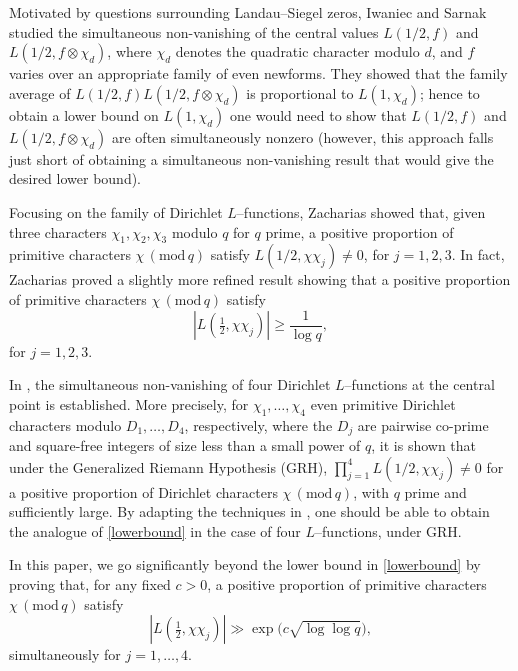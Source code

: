 \documentclass[12pt, reqno]{amsart}
\renewcommand{\pmod}[1]{\,(\mathrm{mod}\,#1)}
\numberwithin{equation}{section}
\numberwithin{theorem}{section}
\numberwithin{equation}{section}
\begin{document}
Motivated by questions surrounding Landau–Siegel zeros, Iwaniec and Sarnak \cite{IS2} studied the simultaneous non-vanishing of the central values $L(1/2,f)$ and $L(1/2, f \otimes \chi_d)$, where $\chi_d$ denotes the quadratic character modulo $d$, and $f$ varies over an appropriate family of even newforms. They showed that the family average of $L(1/2,f) L(1/2,f \otimes \chi_d)$ is proportional to $L(1,\chi_d)$; hence to obtain a lower bound on $L(1,\chi_d)$ one would need to show that $L(1/2,f)$ and $ L(1/2,f \otimes \chi_d)$ are often simultaneously nonzero (however, this approach falls just short of obtaining a simultaneous non-vanishing result that would give the desired lower bound). 

Focusing on the family of Dirichlet $L$--functions, Zacharias \cite{Z} showed that, given three characters $\chi_1, \chi_2, \chi_3$ modulo $q$ for $q$ prime, a positive proportion of primitive characters $\chi \pmod q$ satisfy $L(1/2,\chi \chi_j) \neq 0$, for $j=1,2, 3$. In fact, Zacharias proved a slightly more refined result showing that a positive proportion of primitive characters $\chi \pmod q$ satisfy 
\begin{equation}
\label{lowerbound} 
| L ( \tfrac{1}{2},\chi \chi_j )| \geq \frac{1}{\log q},
\end{equation} for $j=1,2,3.$

In \cite{BFM}, the simultaneous non-vanishing of four Dirichlet $L$--functions at the central point is established. More precisely, for $\chi_1,\ldots,\chi_4$ even primitive Dirichlet characters modulo $D_1,\ldots, D_4$, respectively, where the $D_j$ are pairwise co-prime and square-free integers of size less than a small power of $q$, it is shown that under the Generalized Riemann Hypothesis (GRH), $\prod_{j=1}^4 L(1/2,\chi \chi_j) \neq 0$ for a positive proportion of Dirichlet characters $\chi \pmod q$, with $q$ prime and sufficiently large. By adapting the techniques in \cite{BFM}, one should be able to obtain the analogue of \eqref{lowerbound} in the case of four $L$--functions, under GRH. 

In this paper, we go significantly beyond the lower bound in \eqref{lowerbound} by proving that, for any fixed $c>0$, a positive proportion of primitive characters $\chi \pmod q$ satisfy
\begin{equation}
\label{target} |L(\tfrac12,\chi \chi_j)| \gg \exp \Big(c \sqrt{\log \log q} \Big),
\end{equation} simultaneously for $j=1,\ldots,4$. 
\end{document}
